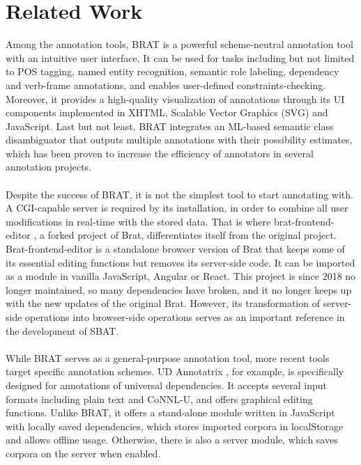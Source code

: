 \documentclass[12ptm a4paper]{article}
\begin{document}
\section{Related Work}
Among the annotation tools, BRAT \citep{stenetorp-etal-2012-brat} is a powerful scheme-neutral annotation tool with an intuitive user interface. It can be used for tasks including but not limited to POS tagging, named entity recognition, semantic role labeling, dependency and verb-frame annotations, and enables user-defined constraints-checking. Moreover, it provides a high-quality visualization of annotations through its UI components implemented in XHTML, Scalable Vector Graphics (SVG) and JavaScript. Last but not least, BRAT integrates an ML-based semantic class disambiguator that outputs multiple annotations with their possibility estimates, which has been proven to increase the efficiency of annotators in several annotation projects.\\
\\
Despite the success of BRAT, it is not the simplest tool to start annotating with. A CGI-capable server is required by its installation, in order to combine all user modifications in real-time with the stored data. That is where brat-frontend-editor \citep{brat-frontend-editor}, a forked project of Brat, differentiates itself from the original project. Brat-frontend-editor is a standalone browser version of Brat that keeps some of its essential editing functions but removes its server-side code. It can be imported as a module in vanilla JavaScript, Angular or React. This project is since 2018 no longer maintained, so many dependencies have broken, and it no longer keeps up with the new updates of the original Brat. However, its transformation of server-side operations into browser-side operations serves as an important reference in the development of SBAT.\\
\\
While BRAT serves as a general-purpose annotation tool, more recent tools target specific annotation schemes. UD Annotatrix \citep{tyers-etal-2017-ud}, for example, is specifically designed for annotations of universal dependencies. It accepts several input formats including plain text and CoNNL-U, and offers graphical editing functions. Unlike BRAT, it offers a stand-alone module written in JavaScript with locally saved dependencies, which stores imported corpora in localStorage and allows offline usage. Otherwise, there is also a server module, which saves corpora on the server when enabled.\\
\end{document}
